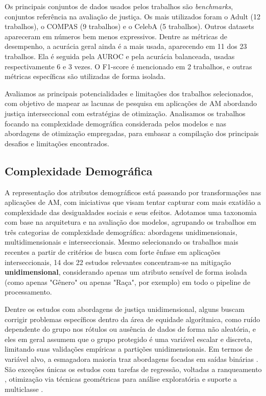 Os principais conjuntos de dados usados pelos trabalhos são \textit{benchmarks}, conjuntos referência na avaliação de justiça. Os mais utilizados foram o Adult (12 trabalhos), o COMPAS (9 trabalhos) e o CelebA (5 trabalhos). Outros datasets apareceram em números bem menos expressivos. Dentre as métricas de desempenho, a acurácia geral ainda é a mais usada, aparecendo em 11 dos 23 trabalhos. Ela é  seguida pela AUROC e pela acurácia balanceada, usadas respectivamente 6 e 3 vezes. O F1-score é mencionado em 2 trabalhos, e outras métricas específicas são utilizadas de forma isolada.

Avaliamos as principais potencialidades e limitações dos trabalhos selecionados, com objetivo de mapear as lacunas de pesquisa em aplicações de AM abordando justiça interseccional com estratégias de otimização. Analisamos os trabalhos focando na complexidade demográfica considerada pelos modelos e nas abordagens de otimização empregadas, para embasar a compilação dos principais desafios e limitações encontrados.

\subsection{Complexidade Demográfica}

A representação dos atributos demográficos está passando por transformações nas aplicações de AM, com iniciativas que visam tentar capturar com mais exatidão a complexidade das desigualdades sociais e seus efeitos. Adotamos uma taxonomia com base na arquitetura e na avaliação dos modelos, agrupando os trabalhos em três categorias de complexidade demográfica: abordagens unidimensionais, multidimensionais e interseccionais. Mesmo selecionando os trabalhos mais recentes a partir de critérios de busca com forte ênfase em aplicações interseccionais, 14 dos 22 estudos relevantes concentram-se na mitigação \textbf{unidimensional}, considerando apenas um atributo sensível de forma isolada (como apenas "Gênero" ou apenas "Raça", por exemplo) em todo o pipeline de processamento.

Dentre os estudos com abordagens de justiça unidimensional, alguns buscam corrigir problemas específicos dentro da área de equidade algorítmica, como ruído dependente do grupo nos rótulos ou ausência de dados de forma não aleatória, e eles em geral assumem que o grupo protegido é uma variável escalar e discreta, limitando suas validações empíricas a partições unidimensionais. Em termos de variável alvo, a esmagadora maioria traz abordagens focadas em saídas binárias \cite{abernethy2020active,almuzaini2022abcinml,rolf2020balancing,yazdani2024fair,pang2024fairness,jeong2022fairness,jang2022group,shui2022learning,delaney2024oxonfair,hsu2022pushing,wang2022understanding}. São exceções únicas os estudos com tarefas de regressão, voltadas a ranqueamento \cite{dinh2024learning}, otimização via técnicas geométricas para análise exploratória \cite{zhou2023fair} e suporte a multiclasse \cite{cho2020fair}.

